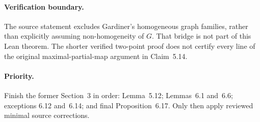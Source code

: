 \documentclass[11pt]{article}
\begin{document}
\paragraph{Verification boundary.}
The source statement excludes Gardiner's homogeneous graph families,
rather than explicitly assuming non-homogeneity of $G$.
That bridge is not part of this Lean theorem. The shorter verified
two-point proof does not certify every line of the original
maximal-partial-map argument in Claim~5.14.

\paragraph{Priority.}
Finish the former Section~3 in order: Lemma~5.12;
Lemmas~6.1 and~6.6; exceptions 6.12 and~6.14;
and final Proposition~6.17. Only then apply reviewed
minimal source corrections.
\end{document}
